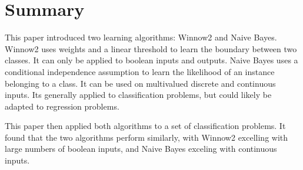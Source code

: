 \documentclass{amsart}
\begin{document}
\section{Summary}
This paper introduced two learning algorithms: Winnow2 and Naive Bayes.
Winnow2 uses weights and a linear threshold to learn the boundary between two classes. It can only be applied
to boolean inputs and outputs. Naive Bayes uses a conditional independence assumption to learn the likelihood of an instance
belonging to a class. It can be used on multivalued discrete and continuous inputs. Its generally applied to classification problems,
but could likely be adapted to regression problems.

This paper then applied both algorithms to a set of classification problems. It found that the two algorithms perform similarly,
with Winnow2 excelling with large numbers of boolean inputs, and Naive Bayes exceling with continuous inputs.




\end{document}
